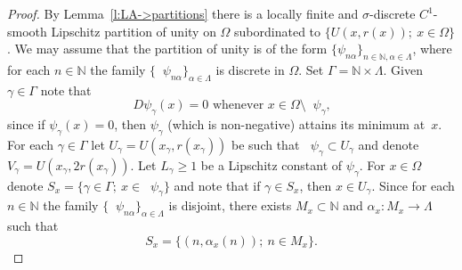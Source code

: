 \documentclass[a4paper,twoside,10pt,reqno,draft]{amsart}
\theoremstyle{definition}
\theoremstyle{remark}
\newcommand\setsep{;\allowbreak\ } %
\newcommand\al{\alpha}
\newcommand\ga{\gamma}
\newcommand\Ga{\Gamma}
\newcommand\Om{\Omega}
\newcommand\sg{\sigma}
\newcommand\N{{\mathbb N}}
\DeclareMathOperator{\suppo}{supp_o}
\begin{document}
\begin{proof}
By Lemma~\ref{l:LA->partitions} there is a locally finite and $\sg$-discrete $C^1$-smooth Lipschitz partition of unity on $\Om$ subordinated to $\{U(x,r(x))\setsep x\in\Om\}$.
We may assume that the partition of unity is of the form $\{\psi_{n\al}\}_{n\in\N,\al\in\Lambda}$,
where for each $n\in\N$ the family $\{\suppo\psi_{n\al}\}_{\al\in\Lambda}$ is discrete in $\Om$.
Set $\Ga=\N\times\Lambda$.
Given $\ga\in\Ga$ note that
\begin{equation}\label{e:der0_2}
\text{$D\psi_\ga(x)=0$ whenever $x\in\Om\setminus\suppo\psi_\ga$,}
\end{equation}
since if $\psi_\ga(x)=0$, then $\psi_\ga$ (which is non-negative) attains its minimum at~$x$.
For each $\ga\in\Ga$ let $U_\ga=U(x_\ga,r(x_\ga))$ be such that $\suppo\psi_\ga\subset U_\ga$ and denote $V_\ga=U(x_\ga,2r(x_\ga))$.
Let $L_\ga\ge1$ be a Lipschitz constant of $\psi_\ga$.
For $x\in\Om$ denote $S_x=\{\ga\in\Ga\setsep x\in\suppo\psi_\ga\}$ and note that if $\ga\in S_x$, then $x\in U_\ga$.
Since for each $n\in\N$ the family $\{\suppo\psi_{n\al}\}_{\al\in\Lambda}$ is disjoint, there exists $M_x\subset\N$ and $\al_x\colon M_x\to\Lambda$ such that
\begin{equation}\label{e:S_x_2}
S_x=\bigl\{(n,\al_x(n))\setsep n\in M_x\bigr\}.
\end{equation}


\end{proof}
\end{document}
